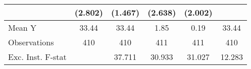 {\begin{tabular}{l*{5}{c}}
            &     (2.802)         &     (1.467)         &     (2.638)         &     (2.002)         &                     \\
\midrule
Mean Y      &       33.44         &       33.44         &        1.85         &        0.19         &       33.44         \\
Observations&         410         &         410         &         411         &         411         &         410         \\
Exc. Inst. F-stat&                     &      37.711         &      30.933         &      31.027         &      12.283         \\
\bottomrule
\end{tabular}
}
